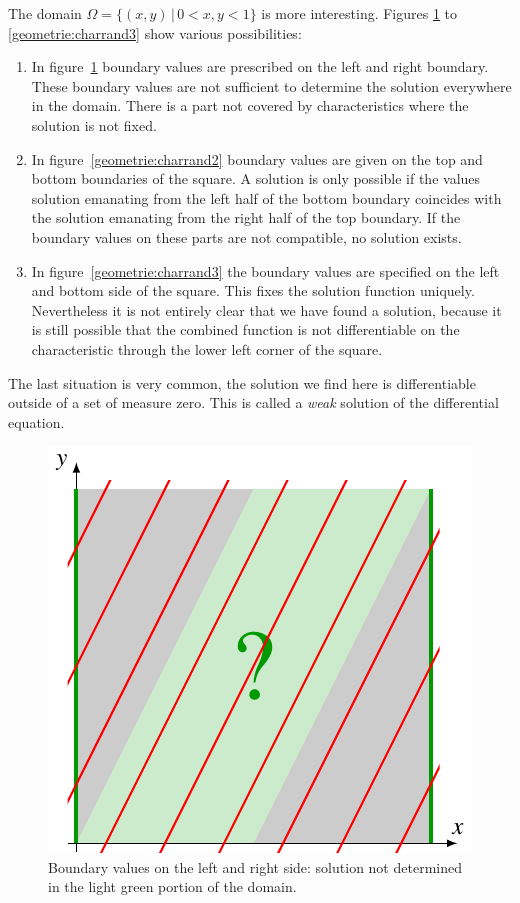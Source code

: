 The domain $\Omega=\{(x,y)\,|\,0<x,y<1\}$ is more interesting.
Figures \ref{geometrie:charrand1}
to \ref{geometrie:charrand3}
show various possibilities:
\begin{enumerate}
\item
In figure~\ref{geometrie:charrand1}
boundary values are prescribed on the left and right boundary.
These boundary values are not sufficient to determine the solution
everywhere in the domain.
There is a part not covered by characteristics where the solution
is not fixed.
\item
In figure~\ref{geometrie:charrand2}
boundary values are given on the top and bottom boundaries of the
square.
A solution is only possible if the values solution emanating from
the left half of the bottom boundary coincides with the solution
emanating from the right half of the top boundary.
If the boundary values on these parts are not compatible, no solution
exists.
\item
In figure~\ref{geometrie:charrand3}
the boundary values are specified on the left and bottom side
of the square.
This fixes the solution function uniquely.
Nevertheless it is not entirely clear that we have found a solution,
because it is still possible that the combined function is not
differentiable on the characteristic through the lower left
corner of the square.
\end{enumerate}
The last situation is very common, the solution we find here is
differentiable outside of a set of measure zero.
This is called a {\em weak} solution of the differential equation.

\begin{figure}
\begin{center}
\includegraphics{3-geometry/images/underdetermined.pdf}
\end{center}
\caption{Boundary values on the left and right side: solution
not determined in the light green portion of the domain.
\label{geometrie:charrand1}}
\end{figure}

